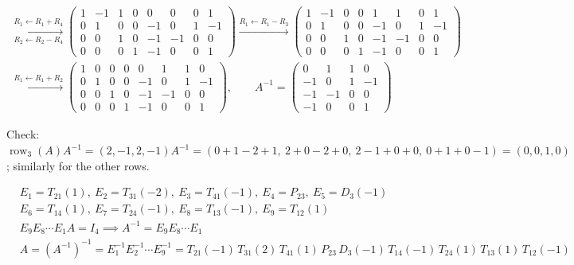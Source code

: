 \documentclass[12pt]{article}
\theoremstyle{definition}
\newcommand{\boardtop}{\vspace*{-\abovedisplayskip}}
\DeclareMathOperator{\row}{row}
\begin{document}
\begin{board}
\[
\begin{gathered}
\xrightarrow[R_2\leftarrow R_2-R_4]{R_1\leftarrow R_1+R_4}
\left(\begin{array}{cccc|cccc}1&-1&1&0&0&0&0&1\\0&1&0&0&-1&0&1&-1\\0&0&1&0&-1&-1&0&0\\0&0&0&1&-1&0&0&1\end{array}\right)
\xrightarrow{R_1\leftarrow R_1-R_3}
\left(\begin{array}{cccc|cccc}1&-1&0&0&1&1&0&1\\0&1&0&0&-1&0&1&-1\\0&0&1&0&-1&-1&0&0\\0&0&0&1&-1&0&0&1\end{array}\right)
\\
\xrightarrow{R_1\leftarrow R_1+R_2}
\left(\begin{array}{cccc|cccc}1&0&0&0&0&1&1&0\\0&1&0&0&-1&0&1&-1\\0&0&1&0&-1&-1&0&0\\0&0&0&1&-1&0&0&1\end{array}\right),
\qquad
A^{-1}=\begin{pmatrix}0&1&1&0\\-1&0&1&-1\\-1&-1&0&0\\-1&0&0&1\end{pmatrix}
\end{gathered}
\]
\end{board}
Check: \(\row_3(A)A^{-1}=(2,-1,2,-1)A^{-1}=(0+1-2+1,\ 2+0-2+0,\ 2-1+0+0,\ 0+1+0-1)=(0,0,1,0)\); similarly for the
other rows.
\begin{board}
\boardtop
\begin{align*}
&E_1=T_{21}(1),\ E_2=T_{31}(-2),\ E_3=T_{41}(-1),\ E_4=P_{23},\ E_5=D_3(-1)\\
&E_6=T_{14}(1),\ E_7=T_{24}(-1),\ E_8=T_{13}(-1),\ E_9=T_{12}(1)\\
&E_9E_8\cdots E_1A=I_4\implies A^{-1}=E_9E_8\cdots E_1\\
&A=(A^{-1})^{-1}=E_1^{-1}E_2^{-1}\cdots E_9^{-1}
=T_{21}(-1)\,T_{31}(2)\,T_{41}(1)\,P_{23}\,D_3(-1)\,T_{14}(-1)\,T_{24}(1)\,T_{13}(1)\,T_{12}(-1)
\end{align*}
\end{board}
\end{document}

